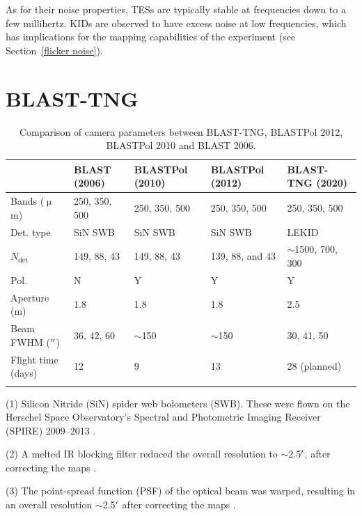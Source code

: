 {As for their noise properties, TESs are typically stable at frequencies down to a few millihertz. KIDs are observed to have excess noise at low frequencies, which has implications for the mapping capabilities of the experiment (see Section~\ref{flicker noise}).

\section{BLAST-TNG}\label{blast}

\begin{table}
\begin{threeparttable}
\centering
\begin{adjustbox}{width=\textwidth}
\begin{tabular}{@{}lllll@{}}
\dtoprule
 & BLAST (2006) & BLASTPol (2010) & BLASTPol (2012) & BLAST-TNG (2020) \\ \midrule
Bands ($\upmu$m) & 250, 350, 500 & 250, 350, 500 & 250, 350, 500 & 250, 350, 500 \\
Det. type & SiN SWB\tnote{1} & SiN SWB & SiN SWB & LEKID \\
$N_{\mathrm{det}}$ & 149, 88, 43 & 149, 88, 43 & 139, 88, and 43 & $\sim$1500, 700, 300 \\
Pol. & N & Y & Y & Y \\
Aperture (m) & 1.8 & 1.8 & 1.8 & 2.5 \\
Beam FWHM ($\operatorname{^{\prime\prime}}$) & 36, 42, 60 & $\sim$150\tnote{2} & $\sim$150\tnote{3} & 30, 41, 50 \\
Flight time (days) & 12 & 9 & 13 & 28 (planned) \\ \dbottomrule
\end{tabular}
\end{adjustbox}
\begin{tablenotes}
\item (1) Silicon Nitride (SiN) spider web bolometers (SWB). These were flown on the Herschel Space Observatory's Spectral and Photometric Imaging Receiver (SPIRE) 2009--2013 \citep{griffin2003spire}.
\item (2) A melted IR blocking filter reduced the overall resolution to $\sim$2.5$\operatorname{^{\prime}}$, after correcting the maps \citep{matthews2014lupus}.
\item (3) The point-spread function (PSF) of the optical beam was warped, resulting in an overall resolution $\sim$2.5$\operatorname{^{\prime}}$ after correcting the maps \citep{fissel2016balloon}.
\end{tablenotes}
\caption{Comparison of camera parameters between BLAST-TNG, BLASTPol 2012, BLASTPol 2010 and BLAST 2006.}
\label{tab:blast_comp}
\end{threeparttable}
\end{table}

}
